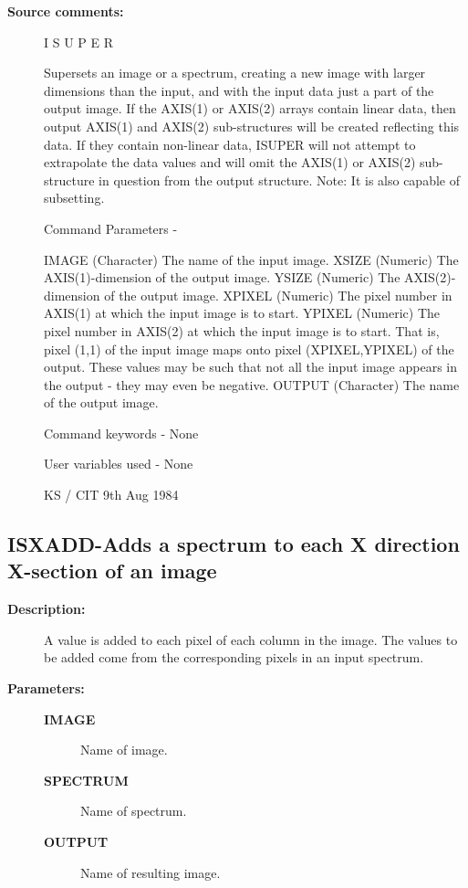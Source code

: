 \begin{description}
\begin{description}
\item [\textbf{Source comments:}]
\begin{terminalv}
 I S U P E R

 Supersets an image or a spectrum, creating a new image
 with larger dimensions than the input, and with the input
 data just a part of the output image.  If the AXIS(1) or
 AXIS(2) arrays contain linear data, then output AXIS(1) and
 AXIS(2) sub-structures will be created reflecting this data.
 If they contain non-linear data, ISUPER will not attempt to
 extrapolate the data values and will omit the AXIS(1) or AXIS(2)
 sub-structure in question from the output structure.
 Note: It is also capable of subsetting.

 Command Parameters -

 IMAGE    (Character) The name of the input image.
 XSIZE    (Numeric) The AXIS(1)-dimension of the output image.
 YSIZE    (Numeric) The AXIS(2)-dimension of the output image.
 XPIXEL   (Numeric) The pixel number in AXIS(1) at which the input
          image is to start.
 YPIXEL   (Numeric) The pixel number in AXIS(2) at which the input
          image is to start.  That is, pixel (1,1) of the input
          image maps onto pixel (XPIXEL,YPIXEL) of the output.
          These values may be such that not all the input image
          appears in the output - they may even be negative.
 OUTPUT   (Character) The name of the output image.

 Command keywords -  None

 User variables used -  None

                                        KS / CIT 9th Aug 1984
\end{terminalv}
\end{description}
\subsection{ISXADD-\label{ISXADD}Adds a spectrum to each X direction X-section of an image}
\begin{description}

\item [\textbf{Description:}]
 A value is added to each pixel of each column in the image.
 The values to be added come from the corresponding pixels in an
 input spectrum.

\item [\textbf{Parameters:}]
\begin{description}
\item [\textbf{IMAGE}]
 Name of image.
\item [\textbf{SPECTRUM}]
 Name of spectrum.
\item [\textbf{OUTPUT}]
 Name of resulting image.
\end{description}


\end{description}
\end{description}
